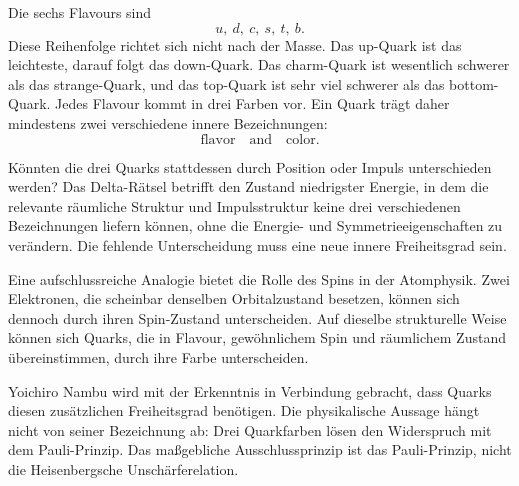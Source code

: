 Die sechs Flavours sind
\begin{equation}
u,\ d,\ c,\ s,\ t,\ b.
\end{equation}
Diese Reihenfolge richtet sich nicht nach der Masse. Das up-Quark ist das leichteste, darauf folgt das down-Quark. Das charm-Quark ist wesentlich schwerer als das strange-Quark, und das top-Quark ist sehr viel schwerer als das bottom-Quark. Jedes Flavour kommt in drei Farben vor. Ein Quark trägt daher mindestens zwei verschiedene innere Bezeichnungen:
\begin{equation}
\text{flavor}\quad\text{and}\quad\text{color}.
\end{equation}

Könnten die drei Quarks stattdessen durch Position oder Impuls unterschieden werden? Das Delta-Rätsel betrifft den Zustand niedrigster Energie, in dem die relevante räumliche Struktur und Impulsstruktur keine drei verschiedenen Bezeichnungen liefern können, ohne die Energie- und Symmetrieeigenschaften zu verändern. Die fehlende Unterscheidung muss eine neue innere Freiheitsgrad sein.

Eine aufschlussreiche Analogie bietet die Rolle des Spins in der Atomphysik. Zwei Elektronen, die scheinbar denselben Orbitalzustand besetzen, können sich dennoch durch ihren Spin-Zustand unterscheiden. Auf dieselbe strukturelle Weise können sich Quarks, die in Flavour, gewöhnlichem Spin und räumlichem Zustand übereinstimmen, durch ihre Farbe unterscheiden.


Yoichiro Nambu wird mit der Erkenntnis in Verbindung gebracht, dass Quarks diesen zusätzlichen Freiheitsgrad benötigen. Die physikalische Aussage hängt nicht von seiner Bezeichnung ab: Drei Quarkfarben lösen den Widerspruch mit dem Pauli-Prinzip. Das maßgebliche Ausschlussprinzip ist das Pauli-Prinzip, nicht die Heisenbergsche Unschärferelation.


